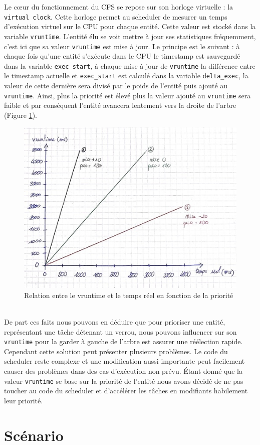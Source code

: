 Le cœur du fonctionnement du CFS se repose sur son horloge virtuelle : la \verb|virtual clock|. Cette horloge permet au scheduler de mesurer un temps d'exécution virtuel sur le CPU pour chaque entité. Cette valeur est stocké dans la variable \verb|vruntime|. L'entité élu se voit mettre à jour ses statistiques fréquemment, c'est ici que sa valeur \verb|vruntime| est mise à jour. Le principe est le suivant : à chaque fois qu'une entité s'exécute dans le CPU le timestamp est sauvegardé dans la variable \verb|exec_start|, à chaque mise à jour de \verb|vruntime| la différence entre le timestamp actuelle et \verb|exec_start| est calculé dans la variable \verb|delta_exec|, la valeur de cette dernière sera divisé par le poids de l'entité puis ajouté au \verb|vruntime|. Ainsi, plus la priorité est élevé plus la valeur ajouté au \verb|vruntime| sera faible et par conséquent l'entité avancera lentement vers la droite de l'arbre (Figure \ref{fig:sched}).
\\

\begin{figure}[h!]
	\centering
	\includegraphics[scale=0.6]{schema_sched.jpg}
	\caption{Relation entre le vruntime et le temps réel en fonction de la priorité}
	\label{fig:sched}
\end{figure}
\\

De part ces faits nous pouvons en déduire que pour prioriser une entité, représentant une tâche détenant un verrou, nous pouvons influencer sur son \verb|vruntime| pour la garder à gauche de l'arbre est assurer une réélection rapide. Cependant cette solution peut présenter plusieurs problèmes. Le code du scheduler reste complexe et une modification aussi importante peut facilement causer des problèmes dans des cas d'exécution non prévu. Étant donné que la valeur \verb|vruntime| se base sur la priorité de l'entité nous avons décidé de ne pas toucher au code du scheduler et d'accélérer les tâches en modifiants habilement leur priorité.

\section*{Scénario}
